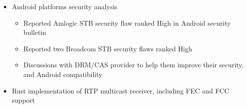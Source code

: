 \documentclass[12pt,a4paper,sans]{moderncv}        %
\begin{document}
{\begin{itemize}
\begin{itemize}
                \item Automatic integration test run on STBs at every merge-request
            \end{itemize}
         \item Android platforms security analysis
            \begin{itemize}
                \item Reported Amlogic STB security flaw ranked High in Android security bulletin
                \item Reported two Broadcom STB security flaws ranked High
                \item Discussions with DRM/CAS provider to help them improve their security, and Android compatibility
            \end{itemize}
         \item Rust implementation of RTP multicast receiver, including FEC and FCC support
	\end{itemize}
}
\end{document}
